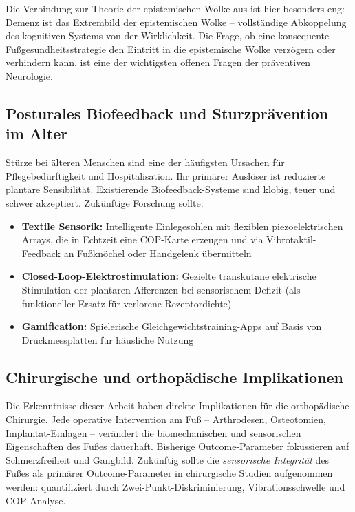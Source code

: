 ﻿\documentclass[12pt,a4paper]{report}
\theoremstyle{plain}
\theoremstyle{definition}
\theoremstyle{remark}
\begin{document}
Die Verbindung zur Theorie der epistemischen Wolke aus \cite{epp2026brn}
ist hier besonders eng: Demenz ist das Extrembild der epistemischen
Wolke -- vollständige Abkoppelung des kognitiven Systems von der
Wirklichkeit. Die Frage, ob eine konsequente Fußgesundheitsstrategie
den Eintritt in die epistemische Wolke verzögern oder verhindern kann,
ist eine der wichtigsten offenen Fragen der präventiven Neurologie.

\subsection{Posturales Biofeedback und Sturzprävention im Alter}

Stürze bei älteren Menschen sind eine der häufigsten Ursachen
für Pflegebedürftigkeit und Hospitalisation. Ihr primärer Auslöser
ist reduzierte plantare Sensibilität. Existierende Biofeedback-Systeme
sind klobig, teuer und schwer akzeptiert. Zukünftige Forschung sollte:

\begin{itemize}
\item \textbf{Textile Sensorik:} Intelligente Einlegesohlen mit
  flexiblen piezoelektrischen Arrays, die in Echtzeit eine
  COP-Karte erzeugen und via Vibrotaktil-Feedback an Fußknöchel
  oder Handgelenk übermitteln
\item \textbf{Closed-Loop-Elektrostimulation:} Gezielte transkutane
  elektrische Stimulation der plantaren Afferenzen bei sensorischem
  Defizit (als funktioneller Ersatz für verlorene Rezeptordichte)
\item \textbf{Gamification:} Spielerische Gleichgewichtstraining-Apps
  auf Basis von Druckmessplatten für häusliche Nutzung
\end{itemize}

\subsection{Chirurgische und orthopädische Implikationen}

Die Erkenntnisse dieser Arbeit haben direkte Implikationen für
die orthopädische Chirurgie. Jede operative Intervention am Fuß --
Arthrodesen, Osteotomien, Implantat-Einlagen -- verändert die
biomechanischen und sensorischen Eigenschaften des Fußes dauerhaft.
Bisherige Outcome-Parameter fokussieren auf Schmerzfreiheit und
Gangbild. Zukünftig sollte die \emph{sensorische Integrität} des
Fußes als primärer Outcome-Parameter in chirurgische Studien
aufgenommen werden: quantifiziert durch Zwei-Punkt-Diskriminierung,
Vibrationsschwelle und COP-Analyse.
\end{document}
